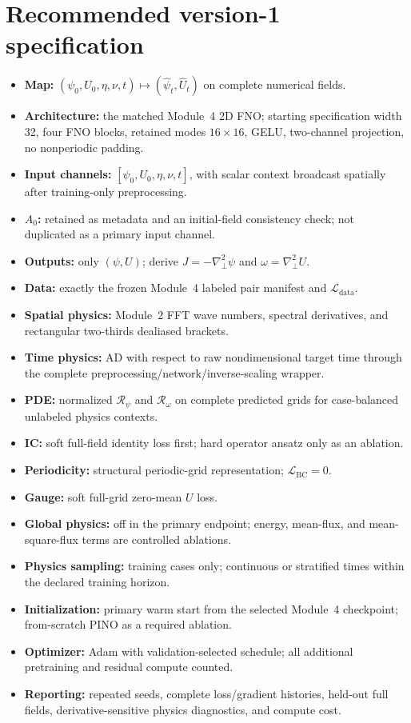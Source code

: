 \documentclass[11pt]{article}
\newcommand{\Lap}{\nabla_\perp^2}
\newcommand{\Rpsi}{\mathcal{R}_{\psi}}
\newcommand{\Romega}{\mathcal{R}_{\omega}}
\newcommand{\Ldata}{\mathcal{L}_{\mathrm{data}}}
\newcommand{\Lbc}{\mathcal{L}_{\mathrm{BC}}}
\begin{document}
\section{Recommended version-1 specification}
\label{sec:specification}

\begin{conventionbox}
\begin{itemize}
  \item \textbf{Map:} $(\psi_0,U_0,\eta,\nu,t)\mapsto(\widehat\psi_t,\widehat U_t)$ on complete numerical fields.
  \item \textbf{Architecture:} the matched Module~4 2D FNO; starting specification width 32, four FNO blocks, retained modes $16\times16$, GELU, two-channel projection, no nonperiodic padding.
  \item \textbf{Input channels:} $[\psi_0,U_0,\eta,\nu,t]$, with scalar context broadcast spatially after training-only preprocessing.
  \item \textbf{$A_0$:} retained as metadata and an initial-field consistency check; not duplicated as a primary input channel.
  \item \textbf{Outputs:} only $(\psi,U)$; derive $J=-\Lap\psi$ and $\omega=\Lap U$.
  \item \textbf{Data:} exactly the frozen Module~4 labeled pair manifest and $\Ldata$.
  \item \textbf{Spatial physics:} Module~2 FFT wave numbers, spectral derivatives, and rectangular two-thirds dealiased brackets.
  \item \textbf{Time physics:} AD with respect to raw nondimensional target time through the complete preprocessing/network/inverse-scaling wrapper.
  \item \textbf{PDE:} normalized $\Rpsi$ and $\Romega$ on complete predicted grids for case-balanced unlabeled physics contexts.
  \item \textbf{IC:} soft full-field identity loss first; hard operator ansatz only as an ablation.
  \item \textbf{Periodicity:} structural periodic-grid representation; $\Lbc=0$.
  \item \textbf{Gauge:} soft full-grid zero-mean $U$ loss.
  \item \textbf{Global physics:} off in the primary endpoint; energy, mean-flux, and mean-square-flux terms are controlled ablations.
  \item \textbf{Physics sampling:} training cases only; continuous or stratified times within the declared training horizon.
  \item \textbf{Initialization:} primary warm start from the selected Module~4 checkpoint; from-scratch PINO as a required ablation.
  \item \textbf{Optimizer:} Adam with validation-selected schedule; all additional pretraining and residual compute counted.
  \item \textbf{Reporting:} repeated seeds, complete loss/gradient histories, held-out full fields, derivative-sensitive physics diagnostics, and compute cost.
\end{itemize}
\end{conventionbox}
\end{document}
